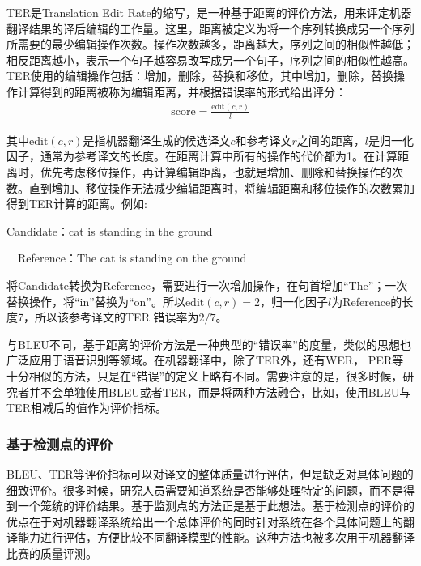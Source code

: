 \parinterval  TER是Translation Edit Rate的缩写，是一种基于距离的评价方法，用来评定机器翻译结果的译后编辑的工作量\cite{snover2006study}。这里，距离被定义为将一个序列转换成另一个序列所需要的最少编辑操作次数。操作次数越多，距离越大，序列之间的相似性越低；相反距离越小，表示一个句子越容易改写成另一个句子，序列之间的相似性越高。TER使用的编辑操作包括：增加，删除，替换和移位，其中增加，删除，替换操作计算得到的距离被称为编辑距离，并根据错误率的形式给出评分：
\begin{eqnarray}
\textrm{score}=\frac{\textrm{edit}(c,r)}{l}
\label{eq:1-5}
\end{eqnarray}

\noindent 其中$\textrm{edit}(c,r)$是指机器翻译生成的候选译文$c$和参考译文$r$之间的距离，$l$是归一化因子，通常为参考译文的长度。在距离计算中所有的操作的代价都为1。在计算距离时，优先考虑移位操作，再计算编辑距离，也就是增加、删除和替换操作的次数。直到增加、移位操作无法减少编辑距离时，将编辑距离和移位操作的次数累加得到TER计算的距离。例如:

\begin{example}
Candidate：cat is standing in the ground

\qquad \qquad \ \  Reference：The cat is standing on the ground
\label{eg:1-2}
\end{example}

\parinterval 将Candidate转换为Reference，需要进行一次增加操作，在句首增加``The''；一次替换操作，将``in''替换为``on''。所以$\textrm{edit}(c,r) = 2$，归一化因子$l$为Reference的长度7，所以该参考译文的TER 错误率为$2/7$。

\parinterval 与BLEU不同，基于距离的评价方法是一种典型的``错误率''的度量，类似的思想也广泛应用于语音识别等领域。在机器翻译中，除了TER外，还有WER， PER等十分相似的方法，只是在``错误''的定义上略有不同。需要注意的是，很多时候，研究者并不会单独使用BLEU或者TER，而是将两种方法融合，比如，使用BLEU与TER相减后的值作为评价指标。


\subsubsection{基于检测点的评价}

\parinterval  BLEU、TER等评价指标可以对译文的整体质量进行评估，但是缺乏对具体问题的细致评价。很多时候，研究人员需要知道系统是否能够处理特定的问题，而不是得到一个笼统的评价结果。基于监测点的方法正是基于此想法\cite{shiwen1993automatic}。基于检测点的评价的优点在于对机器翻译系统给出一个总体评价的同时针对系统在各个具体问题上的翻译能力进行评估，方便比较不同翻译模型的性能。这种方法也被多次用于机器翻译比赛的质量评测。

